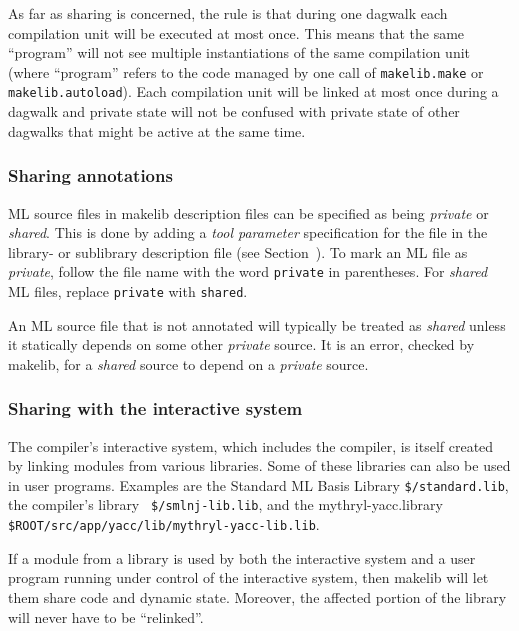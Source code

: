 As far as sharing is concerned, the rule is that during one dagwalk
each compilation unit will be executed at most once.  This means that
the same ``program'' will not see multiple instantiations of the same
compilation unit (where ``program'' refers to the code managed by one
call of {\tt makelib.make} or {\tt makelib.autoload}).  Each compilation unit
will be linked at most once during a dagwalk and private state
will not be confused with private state of other dagwalks that might
be active at the same time.


\subsubsection{Sharing annotations}

ML source files in makelib description files can be specified as being {\em
private} or {\em shared}.  This is done by adding a {\em tool
parameter} specification for the file in the library- or sublibrary
description file (see Section~). To mark an ML file
as {\em private}, follow the file name with the word {\tt private} in
parentheses.  For {\em shared} ML files, replace {\tt private} with
{\tt shared}.

An ML source file that is not annotated will typically be treated as
{\em shared} unless it statically depends on some other {\em private}
source.  It is an error, checked by makelib, for a {\em shared} source to
depend on a {\em private} source.

\subsubsection{Sharing with the interactive system}

The compiler's interactive system, which includes the compiler, is itself
created by linking modules from various libraries. Some of these
libraries can also be used in user programs.  Examples are the
Standard ML Basis Library {\tt \$/standard.lib}, the compiler's library {\tt
\$/smlnj-lib.lib}, and the mythryl-yacc.library {\tt \$ROOT/src/app/yacc/lib/mythryl-yacc-lib.lib}.

If a module from a library is used by both the interactive system and
a user program running under control of the interactive system, then
makelib will let them share code and dynamic state.  Moreover, the affected
portion of the library will never have to be ``relinked''.
